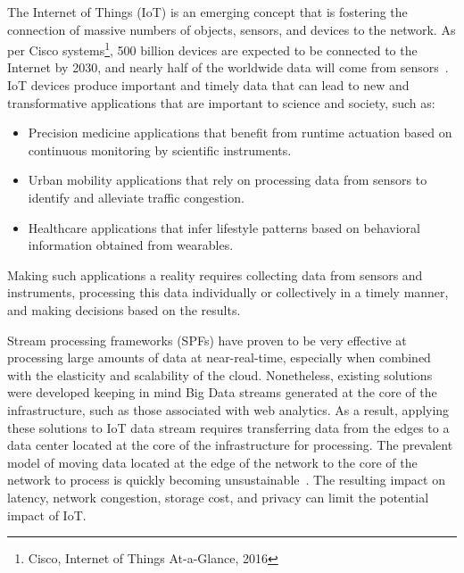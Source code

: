 
The Internet of Things (IoT) is an emerging concept that is fostering the connection of massive numbers of objects, sensors, and devices to the network. As per Cisco systems\footnote{Cisco, Internet of Things At-a-Glance, 2016 }, 500 billion devices are expected to be connected to the Internet by 2030, and nearly half of the worldwide data will come from sensors~\cite{McAuley}. 
%
IoT devices produce important and timely data that can lead to new and transformative applications that are important to science and society, such as:
%
\begin{itemize} 
  \item Precision medicine applications that benefit from runtime actuation based on continuous monitoring by scientific instruments.
  \item Urban mobility applications that rely on processing data from sensors to identify and alleviate traffic congestion. 
  \item Healthcare applications that infer lifestyle patterns based on behavioral information obtained from wearables. 
\end{itemize} 

Making such applications a reality requires collecting data from sensors and instruments, processing this data individually or collectively in a timely manner, and making decisions based on the results. 

Stream processing frameworks (SPFs) have proven to be very effective at processing large amounts of data at near-real-time, especially when combined with the elasticity and scalability of the cloud. Nonetheless, existing solutions were developed keeping in mind Big Data streams generated at the core of the infrastructure, such as those associated with web analytics. As a result, applying these solutions to IoT data stream requires transferring data from the edges to a data center located at the core of the infrastructure for processing. The prevalent model of moving data located at the edge of the network to the core of the network to process is quickly becoming unsustainable~\cite{intro}. The resulting impact on latency, network congestion, storage cost, and privacy can limit the potential impact of IoT.

